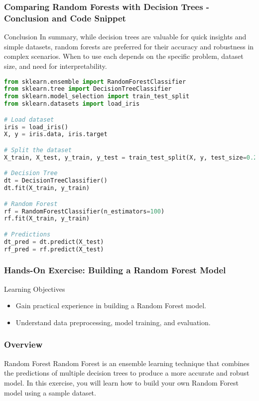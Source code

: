 \documentclass[aspectratio=169]{beamer}
\begin{document}
\begin{frame}[fragile]
    \frametitle{Comparing Random Forests with Decision Trees - Conclusion and Code Snippet}
    \begin{block}{Conclusion}
        In summary, while decision trees are valuable for quick insights and simple datasets, random forests are preferred for their accuracy and robustness in complex scenarios. When to use each depends on the specific problem, dataset size, and need for interpretability.
    \end{block}

    \begin{lstlisting}[language=Python]
from sklearn.ensemble import RandomForestClassifier
from sklearn.tree import DecisionTreeClassifier
from sklearn.model_selection import train_test_split
from sklearn.datasets import load_iris

# Load dataset
iris = load_iris()
X, y = iris.data, iris.target

# Split the dataset
X_train, X_test, y_train, y_test = train_test_split(X, y, test_size=0.2, random_state=42)

# Decision Tree
dt = DecisionTreeClassifier()
dt.fit(X_train, y_train)

# Random Forest
rf = RandomForestClassifier(n_estimators=100)
rf.fit(X_train, y_train)

# Predictions
dt_pred = dt.predict(X_test)
rf_pred = rf.predict(X_test)
    \end{lstlisting}
\end{frame}

\begin{frame}
    \frametitle{Hands-On Exercise: Building a Random Forest Model}
    \begin{block}{Learning Objectives}
        \begin{itemize}
            \item Gain practical experience in building a Random Forest model.
            \item Understand data preprocessing, model training, and evaluation.
        \end{itemize}
    \end{block}
\end{frame}

\begin{frame}
    \frametitle{Overview}
    \begin{block}{Random Forest}
        Random Forest is an ensemble learning technique that combines the predictions of multiple decision trees to produce a more accurate and robust model. In this exercise, you will learn how to build your own Random Forest model using a sample dataset.
    \end{block}
\end{frame}
\end{document}
